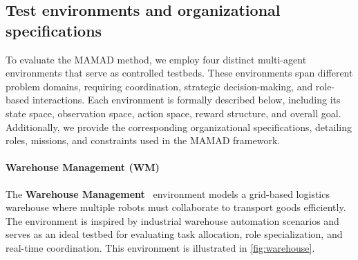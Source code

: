 \documentclass[pdflatex,sn-mathphys-num]{sn-jnl}%
\theoremstyle{thmstyleone}%
\theoremstyle{thmstyletwo}%
\theoremstyle{thmstylethree}%
\begin{document}
\subsection{Test environments and organizational specifications}

To evaluate the MAMAD method, we employ four distinct multi-agent environments that serve as controlled testbeds. These environments span different problem domains, requiring coordination, strategic decision-making, and role-based interactions. Each environment is formally described below, including its state space, observation space, action space, reward structure, and overall goal. Additionally, we provide the corresponding organizational specifications, detailing roles, missions, and constraints used in the MAMAD framework.

\paragraph{Warehouse Management (WM)}
The \textbf{Warehouse Management}~\cite{warehouse_management} environment models a grid-based logistics warehouse where multiple robots must collaborate to transport goods efficiently. The environment is inspired by industrial warehouse automation scenarios and serves as an ideal testbed for evaluating task allocation, role specialization, and real-time coordination. This environment is illustrated in \autoref{fig:warehouse}.
%
\end{document}
